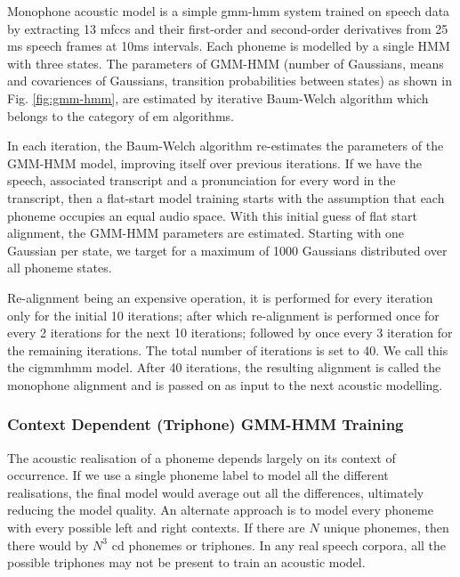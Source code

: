 Monophone acoustic model is a simple \gls{gmm}-\gls{hmm} system trained on speech data by
extracting 13  \gls{mfcc}s and their first-order
and second-order derivatives from 25 ms speech frames at 10ms intervals. Each
phoneme is modelled by a single HMM with three states. The parameters of
GMM-HMM (number of Gaussians, means and covariences of Gaussians, transition
probabilities between states) as shown in Fig. \ref{fig:gmm-hmm}, are estimated
by iterative Baum-Welch algorithm which belongs to the category of \gls{em}
algorithms\cite{jurafsky2014speech}.

In each iteration, the Baum-Welch algorithm re-estimates the parameters of the
GMM-HMM model, improving itself over previous iterations. If we have the speech,
associated transcript and a pronunciation for every word in the transcript,
then a flat-start model training starts with the assumption that each phoneme
occupies an equal audio space. With this initial guess of flat start alignment,
the GMM-HMM parameters are estimated. Starting with one Gaussian per state, we
target for a maximum of 1000 Gaussians distributed over all phoneme states.

Re-alignment being an expensive operation, it is performed for every iteration
only for the initial 10 iterations; after which re-alignment is performed once
for every 2 iterations for the next 10 iterations; followed by once every 3
iteration for the remaining iterations. The total number of iterations is set
to 40. We call this the \gls{cigmmhmm} model. After 40 iterations, the resulting alignment is called the monophone
alignment and is passed on as input to the next acoustic modelling.

\subsubsection{Context Dependent (Triphone) GMM-HMM Training}

The acoustic realisation of a phoneme depends largely on its context of
occurrence. If we use a single phoneme label to model all the different realisations,
the final model would average out all the differences, ultimately reducing the
model quality. An alternate approach is to model every phoneme with every
possible left and right contexts. If there are $N$ unique phonemes, then there
would by $N^3$ \gls{cd} phonemes or triphones.
In any real speech corpora, all the possible triphones may not be present to train an acoustic
model.

